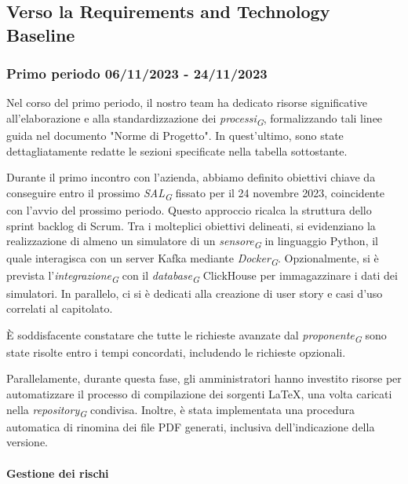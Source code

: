 \subsection{Verso la Requirements and Technology Baseline}
\subsubsection{Primo periodo  06/11/2023 - 24/11/2023}
    Nel corso del primo periodo, il nostro team ha dedicato risorse significative all'elaborazione e alla standardizzazione dei \textit{processi}\textsubscript{\textit{G}}, formalizzando tali linee guida nel documento "Norme di Progetto". In quest'ultimo, sono state dettagliatamente redatte le sezioni specificate nella tabella sottostante.

    Durante il primo incontro con l'azienda, abbiamo definito obiettivi chiave da conseguire entro il prossimo \textit{SAL}\textsubscript{\textit{G}} fissato per il 24 novembre 2023, coincidente con l'avvio del prossimo periodo. Questo approccio ricalca la struttura dello sprint backlog di Scrum.
    Tra i molteplici obiettivi delineati, si evidenziano la realizzazione di almeno un simulatore di un \textit{sensore}\textsubscript{\textit{G}} in linguaggio Python, il quale interagisca con un server Kafka mediante \textit{Docker}\textsubscript{\textit{G}}. Opzionalmente, si è prevista l'\textit{integrazione}\textsubscript{\textit{G}} con il \textit{database}\textsubscript{\textit{G}} ClickHouse per immagazzinare i dati dei simulatori. In parallelo, ci si è dedicati alla creazione di user story e casi d'uso correlati al capitolato.

    È soddisfacente constatare che tutte le richieste avanzate dal \textit{proponente}\textsubscript{\textit{G}} sono state risolte entro i tempi concordati, includendo le richieste opzionali.

    Parallelamente, durante questa fase, gli amministratori hanno investito risorse per automatizzare il processo di compilazione dei sorgenti \LaTeX , una volta caricati nella \textit{repository}\textsubscript{\textit{G}} condivisa. Inoltre, è stata implementata una procedura automatica di rinomina dei file PDF generati, inclusiva dell'indicazione della versione.

\paragraph{Gestione dei rischi} 

